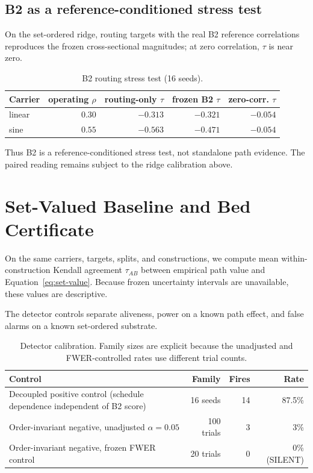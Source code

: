 \documentclass{article}
\begin{document}
\subsection{B2 as a reference-conditioned stress test}
On the set-ordered ridge, routing targets with the real B2 reference correlations reproduces the
frozen cross-sectional magnitudes; at zero correlation, $\tau$ is near zero.

\begin{table}[t]
\centering\small
\caption{B2 routing stress test (16 seeds).}
\label{tab:b2-stress}
\begin{tabular}{lrrrr}
\toprule
Carrier & operating $\rho$ & routing-only $\tau$ & frozen B2 $\tau$ & zero-corr. $\tau$ \\
\midrule
linear & $0.30$ & $-0.313$ & $-0.321$ & $-0.054$ \\
sine & $0.55$ & $-0.563$ & $-0.471$ & $-0.054$ \\
\bottomrule
\end{tabular}
\end{table}

Thus B2 is a reference-conditioned stress test, not standalone path evidence. The paired reading
remains subject to the ridge calibration above.

\section{Set-Valued Baseline and Bed Certificate}
On the same carriers, targets, splits, and constructions, we compute mean within-construction
Kendall agreement $\tau_{AB}$ between empirical path value and Equation~\ref{eq:set-value}.
Because frozen uncertainty intervals are unavailable, these values are descriptive.

The detector controls separate aliveness, power on a known path effect, and false alarms on a known
set-ordered substrate.

\begin{table}[H]
\centering\footnotesize
\caption{Detector calibration. Family sizes are explicit because the unadjusted and FWER-controlled
rates use different trial counts.}
\label{tab:detector}
\begin{tabularx}{\linewidth}{@{}Xrrr@{}}
\toprule
Control & Family & Fires & Rate \\
\midrule
Decoupled positive control (schedule dependence independent of B2 score) & 16 seeds & 14 & 87.5\% \\
Order-invariant negative, unadjusted $\alpha=0.05$ & 100 trials & 3 & 3\% \\
Order-invariant negative, frozen FWER control & 20 trials & 0 & 0\% (SILENT) \\
\bottomrule
\end{tabularx}
\end{table}
\end{document}
